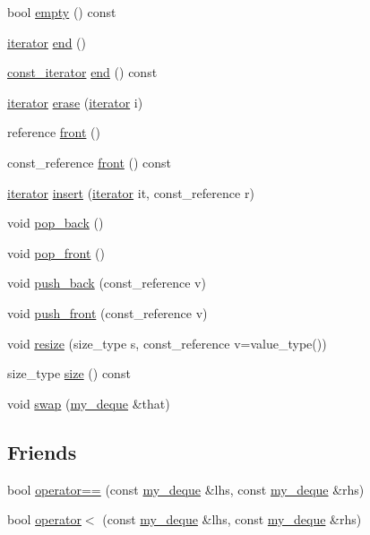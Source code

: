 \begin{DoxyCompactItemize}
\item 
bool \hyperlink{classmy__deque_a2b4f029c47afbdbf057639c5a6816d6c}{empty} () const 
\item 
\hyperlink{classmy__deque_1_1iterator}{iterator} \hyperlink{classmy__deque_a2576ee71790ebe55ac4200c506540bb5}{end} ()
\item 
\hyperlink{classmy__deque_1_1const__iterator}{const\-\_\-iterator} \hyperlink{classmy__deque_af465c3f8483634e4e656d90f8d0d88fb}{end} () const 
\item 
\hyperlink{classmy__deque_1_1iterator}{iterator} \hyperlink{classmy__deque_a68328ee9d14996c56ccac5e9981741d5}{erase} (\hyperlink{classmy__deque_1_1iterator}{iterator} i)
\item 
reference \hyperlink{classmy__deque_a0eae28af0ffdd813d1f94f57d393fdf8}{front} ()
\item 
const\-\_\-reference \hyperlink{classmy__deque_a0f1239043b7339b8237a0c8bc663be6b}{front} () const 
\item 
\hyperlink{classmy__deque_1_1iterator}{iterator} \hyperlink{classmy__deque_a8f6b40ddfb98b9b2fb0f05367e584a20}{insert} (\hyperlink{classmy__deque_1_1iterator}{iterator} it, const\-\_\-reference r)
\item 
void \hyperlink{classmy__deque_a63cc9691ee90701693e948246311c498}{pop\-\_\-back} ()
\item 
void \hyperlink{classmy__deque_a85c322cdc4f629e44abdcf369fdd3dab}{pop\-\_\-front} ()
\item 
void \hyperlink{classmy__deque_a15867a8b57c321dcc8ebb4cfa785d7ca}{push\-\_\-back} (const\-\_\-reference v)
\item 
void \hyperlink{classmy__deque_af8d66a7ed1fd51476ec785228ac76996}{push\-\_\-front} (const\-\_\-reference v)
\item 
void \hyperlink{classmy__deque_a80369f549dcd0a2ea9bc086fc97c8e25}{resize} (size\-\_\-type s, const\-\_\-reference v=value\-\_\-type())
\item 
size\-\_\-type \hyperlink{classmy__deque_a3100498f22d2dfa480b141f8ef7990ca}{size} () const 
\item 
void \hyperlink{classmy__deque_a50f83432394d6d068d4d96a3515d7b79}{swap} (\hyperlink{classmy__deque}{my\-\_\-deque} \&that)
\end{DoxyCompactItemize}
\subsection*{Friends}
\begin{DoxyCompactItemize}
\item 
bool \hyperlink{classmy__deque_aca1e37552707f9d7710a6af82cf1262e}{operator==} (const \hyperlink{classmy__deque}{my\-\_\-deque} \&lhs, const \hyperlink{classmy__deque}{my\-\_\-deque} \&rhs)
\item 
bool \hyperlink{classmy__deque_abd32df1d76a0ab0c1519f65cc4fa1363}{operator$<$} (const \hyperlink{classmy__deque}{my\-\_\-deque} \&lhs, const \hyperlink{classmy__deque}{my\-\_\-deque} \&rhs)
\end{DoxyCompactItemize}


